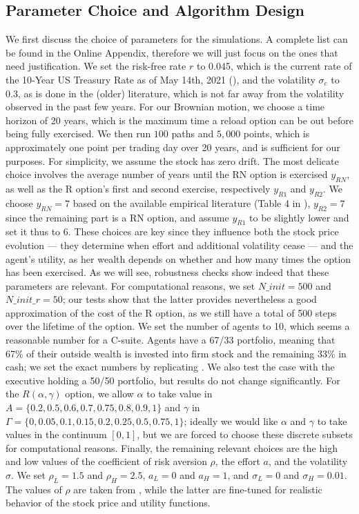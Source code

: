 \subsection{Parameter Choice and Algorithm Design}
We first discuss the choice of parameters for the simulations. A complete list can be found in the Online Appendix,
therefore we will just focus on the ones that need justification. We set the risk-free rate $r$ to 0.045, which is the current rate of the 10-Year US Treasury Rate as of May 14th, 2021 (\cite{ychartrfrate}), and the volatility $\sigma_c$ to 0.3, as is done in the (older) literature, which is not far away from the volatility observed in the past few years. For our Brownian motion, we choose a time horizon of 20 years, which is the maximum time a reload option can be out before being fully exercised. We then run $100$ paths and $5,000$ points, which is approximately one point per trading day over 20 years, and is sufficient for our purposes. For simplicity, we assume the stock has zero drift. The most delicate choice involves the average number of years until the RN option is exercised $y_{RN}$, as well as the R option's first and second exercise, respectively $y_{R1}$ and $y_{R2}$. We choose $y_{RN} = 7$ based on the available empirical literature (Table 4 in \cite{murphy2019employees}), $y_{R2} = 7$ since the remaining part is a RN option, and assume $y_{R1}$ to be slightly lower and set it thus to 6. These choices are key since they influence both the stock price evolution --- they determine when effort and additional volatility cease --- and the agent's utility, as her wealth depends on whether and how many times the option has been exercised. As we will see, robustness checks show indeed that these parameters are relevant. For computational reasons, we set $N\_init = 500$ and $N\_init\_r = 50$; our tests show that the latter provides nevertheless a good approximation of the cost of the R option, as we still have a total of 500 steps over the lifetime of the option. We set the number of agents to 10, which seems a reasonable number for a C-suite. Agents have a 67/33 portfolio, meaning that 67\% of their outside wealth is invested into firm stock and the remaining 33\% in cash; we set the exact numbers by replicating \cite{carpenter1998exercise}. We also test the case with the executive holding a 50/50 portfolio, but results do not change significantly. For the $R(\alpha, \gamma)$ option, we allow $\alpha$ to take value in $A = \{0.2, 0.5, 0.6, 0.7, 0.75, 0.8, 0.9, 1\}$ and $\gamma$ in $\Gamma = \{0, 0.05, 0.1, 0.15, 0.2, 0.25, 0.5, 0.75, 1\}$; ideally we would like $\alpha$ and $\gamma$ to take values in the continuum $[0, 1]$, but we are forced to choose these discrete subsets for computational reasons. Finally, the remaining relevant choices are the high and low values of the coefficient of risk aversion $\rho$, the effort $a$, and the volatility $\sigma$. We set $\rho_L = 1.5$ and $\rho_H = 2.5$, $a_L = 0$ and $a_H = 1$, and $\sigma_L = 0$ and $\sigma_H = 0.01$. The values of $\rho$ are taken from \cite{carpenter1998exercise}, while the latter are fine-tuned for realistic behavior of the stock price and utility functions. 


